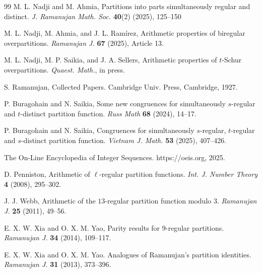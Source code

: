 \documentclass[12pt]{amsart}
\theoremstyle{plain}
\theoremstyle{definition}
\begin{document}
\begin{thebibliography}{99}
  M. L. Nadji and M. Ahmia, Partitions into parts simultaneously regular and distinct. \textit{J. Ramanujan Math. Soc.} \textbf{40}(2) (2025), 125--150

 M. L. Nadji, M. Ahmia, and J. L. Ramírez, Arithmetic properties of biregular overpartitions. \textit{Ramanujan J.} \textbf{67} (2025), Article 13.

 M. L. Nadji, M. P. Saikia, and J. A. Sellers, Arithmetic properties of $t$-Schur overpartitions. \textit{Quaest. Math.}, in press.

 S. Ramanujan, Collected Papers. Cambridge Univ. Press, Cambridge, 1927.

 P. Buragohain and N. Saikia, Some new congruences for simultaneously $s$-regular and $t$-distinct partition function. \textit{Russ Math} \textbf{68} (2024), 14--17.

 P. Buragohain and N. Saikia, Congruences for simultaneously $s$-regular, $t$-regular and $s$-distinct partition function. \textit{Vietnam J. Math.} \textbf{53} (2025), 407--426.

 The On-Line Encyclopedia of Integer Sequences. https://oeis.org, 2025.

 D. Penniston, Arithmetic of $\ell$-regular partition functions. \textit{Int. J. Number Theory} {\bf 4} (2008), 295--302.

 J. J. Webb, Arithmetic of the $13$-regular partition function modulo $3$. \textit{Ramanujan J.} {\bf 25} (2011), 49--56.

 E. X. W. Xia and O. X. M. Yao, Parity results for $9$-regular partitions. \textit{Ramanujan J.} {\bf 34} (2014), 109--117.

 E. X. W. Xia and O. X. M. Yao. Analogues of Ramanujan's partition identities. \textit{Ramanujan J.} {\bf 31} (2013), 373--396.

\end{thebibliography}
\end{document}
